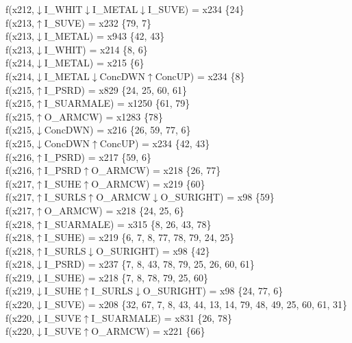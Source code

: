 f(x212,$\downarrow$I\_WHIT$\downarrow$I\_METAL$\downarrow$I\_SUVE) = x234 \{24\} \\  
f(x213,$\uparrow$I\_SUVE) = x232 \{79, 7\} \\  
f(x213,$\downarrow$I\_METAL) = x943 \{42, 43\} \\  
f(x213,$\downarrow$I\_WHIT) = x214 \{8, 6\} \\  
f(x214,$\downarrow$I\_METAL) = x215 \{6\} \\  
f(x214,$\downarrow$I\_METAL$\downarrow$ConcDWN$\uparrow$ConcUP) = x234 \{8\} \\  
f(x215,$\uparrow$I\_PSRD) = x829 \{24, 25, 60, 61\} \\  
f(x215,$\uparrow$I\_SUARMALE) = x1250 \{61, 79\} \\  
f(x215,$\uparrow$O\_ARMCW) = x1283 \{78\} \\  
f(x215,$\downarrow$ConcDWN) = x216 \{26, 59, 77, 6\} \\  
f(x215,$\downarrow$ConcDWN$\uparrow$ConcUP) = x234 \{42, 43\} \\  
f(x216,$\uparrow$I\_PSRD) = x217 \{59, 6\} \\  
f(x216,$\uparrow$I\_PSRD$\uparrow$O\_ARMCW) = x218 \{26, 77\} \\  
f(x217,$\uparrow$I\_SUHE$\uparrow$O\_ARMCW) = x219 \{60\} \\  
f(x217,$\uparrow$I\_SURLS$\uparrow$O\_ARMCW$\downarrow$O\_SURIGHT) = x98 \{59\} \\  
f(x217,$\uparrow$O\_ARMCW) = x218 \{24, 25, 6\} \\  
f(x218,$\uparrow$I\_SUARMALE) = x315 \{8, 26, 43, 78\} \\  
f(x218,$\uparrow$I\_SUHE) = x219 \{6, 7, 8, 77, 78, 79, 24, 25\} \\  
f(x218,$\uparrow$I\_SURLS$\downarrow$O\_SURIGHT) = x98 \{42\} \\  
f(x218,$\downarrow$I\_PSRD) = x237 \{7, 8, 43, 78, 79, 25, 26, 60, 61\} \\  
f(x219,$\downarrow$I\_SUHE) = x218 \{7, 8, 78, 79, 25, 60\} \\  
f(x219,$\downarrow$I\_SUHE$\uparrow$I\_SURLS$\downarrow$O\_SURIGHT) = x98 \{24, 77, 6\} \\  
f(x220,$\downarrow$I\_SUVE) = x208 \{32, 67, 7, 8, 43, 44, 13, 14, 79, 48, 49, 25, 60, 61, 31\} \\  
f(x220,$\downarrow$I\_SUVE$\uparrow$I\_SUARMALE) = x831 \{26, 78\} \\  
f(x220,$\downarrow$I\_SUVE$\uparrow$O\_ARMCW) = x221 \{66\} \\  
